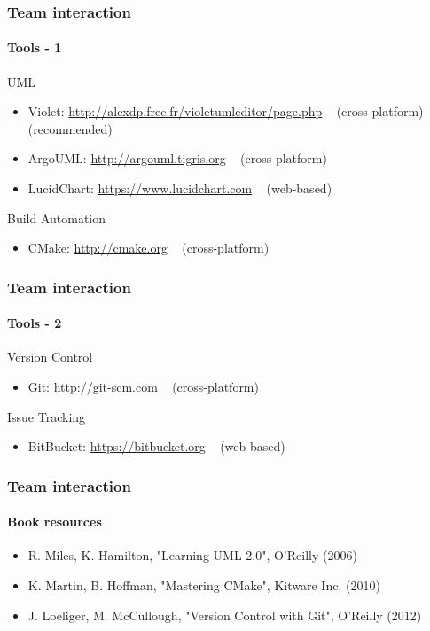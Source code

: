 \begin{frame}
\frametitle{Team interaction}
\framesubtitle{Tools - 1}
\begin{block}{UML}
\begin{itemize}
\item Violet: \url{http://alexdp.free.fr/violetumleditor/page.php} \,\,\, (cross-platform) (recommended)
\item ArgoUML: \url{http://argouml.tigris.org} \,\,\, (cross-platform)
\item LucidChart: \url{https://www.lucidchart.com} \,\,\, (web-based)
\end{itemize}
\end{block}

\begin{block}{Build Automation}
\begin{itemize}
\item CMake: \url{http://cmake.org} \,\,\, (cross-platform)
\end{itemize}
\end{block}

\end{frame}

\begin{frame}
\frametitle{Team interaction}
\framesubtitle{Tools - 2}

\begin{block}{Version Control}
\begin{itemize}
\item Git: \url{http://git-scm.com} \,\,\, (cross-platform)
\end{itemize}
\end{block}

\begin{block}{Issue Tracking}
\begin{itemize}
\item BitBucket: \url{https://bitbucket.org} \,\,\, (web-based)
\end{itemize}
\end{block}

\end{frame}

\begin{frame}
\frametitle{Team interaction}
\framesubtitle{Book resources}
\begin{itemize}
\item R. Miles, K. Hamilton, "Learning UML 2.0", O'Reilly (2006)
\item K. Martin, B. Hoffman, "Mastering CMake", Kitware Inc. (2010)
\item J. Loeliger, M. McCullough, "Version Control with Git", O'Reilly (2012)
\end{itemize}
\end{frame}

